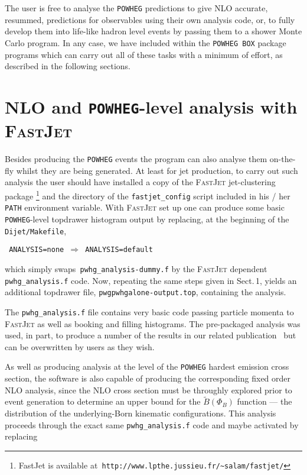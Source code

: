 \documentclass[paper]{JHEP3}
\newcommand\POWHEG{{\tt POWHEG}}
\newcommand\POWHEGBOX{{\tt POWHEG BOX}}
\begin{document}
The user is free to analyse the \POWHEG{} predictions to give
NLO accurate, resummed, predictions for observables using their own
analysis code, or, to fully develop them into life-like hadron level
events by passing them to a shower Monte Carlo program. In any case,
we have included within the \POWHEGBOX{} package programs
which can carry out all of these tasks with a minimum of effort, as
described in the following sections. 


\section{NLO and \POWHEG{}-level analysis with \textsc{FastJet}}

Besides producing the \POWHEG{} events the program can also
analyse them on-the-fly whilst they are being generated. At least
for jet production, to carry out such analysis the user should have
installed a copy of the \textsc{FastJet} jet-clustering package%
\footnote{FastJet is available at\texttt{ http://www.lpthe.jussieu.fr/\textasciitilde{}salam/fastjet/}%
} and the directory of the \texttt{fastjet\_config} script included
in his / her \texttt{PATH} environment variable. With \textsc{FastJet}
set up one can produce some basic \POWHEG{}-level topdrawer
histogram output by replacing, at the beginning of the \texttt{Dijet/Makefile}, 

\begin{center}
\texttt{\medskip{}
ANALYSIS=none $\Rightarrow$ ANALYSIS=default\medskip{}
}
\par\end{center}

\noindent which simply swaps\texttt{ pwhg\_analysis-dummy.f} by the
\textsc{FastJet} dependent \texttt{pwhg\_analysis.f} code. Now, repeating
the same steps given in Sect.\,1, yields an additional topdrawer
file, \texttt{pwgpwhgalone-output.top}, containing the analysis.

The \texttt{pwhg\_analysis.f} file contains very basic code passing particle
momenta to \textsc{FastJet} as well as booking and filling histograms. The
pre-packaged analysis was used, in part, to produce a number of the results
in our related publication~\cite{Alioli:2010xa} but can be overwritten by
users as they wish.

As well as producing analysis at the level of the \POWHEG{}
hardest emission cross section, the software is also capable of producing
the corresponding fixed order NLO analysis, since the NLO cross section
must be throughly explored prior to event generation to determine
an upper bound for the $\widetilde{B}\left(\Phi_{B}\right)$ function
--- the distribution of the underlying-Born kinematic configurations.
This analysis proceeds through the exact same \texttt{pwhg\_analysis.f}
code and maybe activated by replacing
\end{document}
